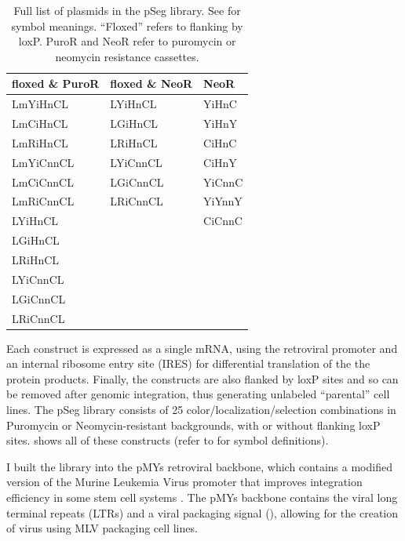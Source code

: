    \begin{table}[!bt]
    \centering
	\footnotesize
    \caption[List of pSeg plasmids.]
    { Full list of plasmids in the pSeg library. See
      for symbol meanings. ``Floxed''
     refers to flanking by loxP.
     PuroR and NeoR refer to puromycin or neomycin resistance
     cassettes.}
    \label{table:pseg:library}
    \begin{tabular}{lll}
    \hline
    floxed \& PuroR & floxed \& NeoR & NeoR   \\ \hline
    LmYiHnCL        & LYiHnCL        & YiHnC  \\
    LmCiHnCL        & LGiHnCL        & YiHnY  \\
    LmRiHnCL        & LRiHnCL        & CiHnC  \\
    LmYiCnnCL       & LYiCnnCL       & CiHnY  \\
    LmCiCnnCL       & LGiCnnCL       & YiCnnC \\
    LmRiCnnCL       & LRiCnnCL       & YiYnnY \\
    LYiHnCL         &                & CiCnnC \\
    LGiHnCL         &                &        \\
    LRiHnCL         &                &        \\
    LYiCnnCL        &                &        \\
    LGiCnnCL        &                &        \\
    LRiCnnCL        &                &        \\ \hline
    \end{tabular}
    \end{table}


Each construct is expressed as a single
mRNA, using the retroviral promoter and an internal
ribosome entry site (IRES) for differential translation
of the the protein products. Finally, the constructs are
also flanked by loxP sites and so can be removed after
genomic integration, thus generating unlabeled ``parental'' cell lines.
The pSeg library consists of 25 color/localization/selection 
combinations in Puromycin or Neomycin-resistant backgrounds,
with or without flanking loxP sites.
 shows all of
these constructs (refer to  for symbol definitions).


I built the library into
the pMYs retroviral backbone, which contains a modified
version of the Murine Leukemia Virus promoter that
improves integration efficiency in some stem cell systems \cite{Kitamura2003}.
The pMYs backbone contains the viral long terminal repeats
(LTRs) and a viral packaging signal (), allowing for the creation
of virus using MLV packaging cell lines. 



